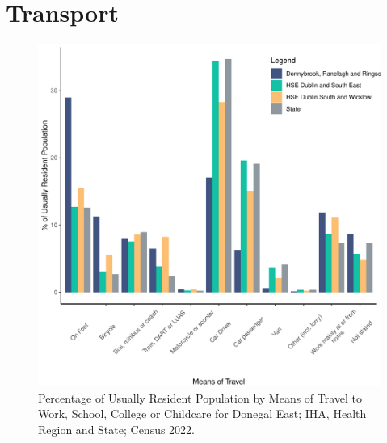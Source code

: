 \documentclass{article}
\begin{document}
\section{Transport}\label{sect:Trans}
\begin{figure}[H]
	\centering
	\includegraphics[width = 120mm]{../figures/TravelED.pdf}
	\caption{Percentage of Usually Resident Population by Means of Travel to Work, School, College or Childcare for Donegal East; IHA, Health Region and State; Census 2022.}
	\label{fig:vbnv}
	\end{figure}
\end{document}
